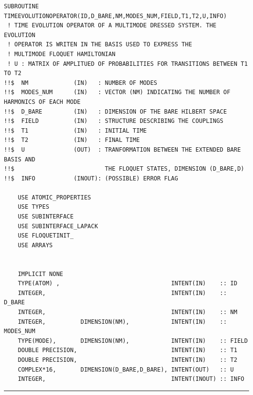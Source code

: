 \documentclass[10pt,a4paper]{article}
\begin{document}
\begin{verbatim}
SUBROUTINE TIMEEVOLUTIONOPERATOR(ID,D_BARE,NM,MODES_NUM,FIELD,T1,T2,U,INFO) 
 ! TIME EVOLUTION OPERATOR OF A MULTIMODE DRESSED SYSTEM. THE EVOLUTION 
 ! OPERATOR IS WRITEN IN THE BASIS USED TO EXPRESS THE 
 ! MULTIMODE FLOQUET HAMILTONIAN
 ! U : MATRIX OF AMPLITUED OF PROBABILITIES FOR TRANSITIONS BETWEEN T1 TO T2
!!$  NM             (IN)   : NUMBER OF MODES            
!!$  MODES_NUM      (IN)   : VECTOR (NM) INDICATING THE NUMBER OF HARMONICS OF EACH MODE
!!$  D_BARE         (IN)   : DIMENSION OF THE BARE HILBERT SPACE
!!$  FIELD          (IN)   : STRUCTURE DESCRIBING THE COUPLINGS
!!$  T1             (IN)   : INITIAL TIME
!!$  T2             (IN)   : FINAL TIME
!!$  U              (OUT)  : TRANFORMATION BETWEEN THE EXTENDED BARE BASIS AND 
!!$                          THE FLOQUET STATES, DIMENSION (D_BARE,D)
!!$  INFO           (INOUT): (POSSIBLE) ERROR FLAG
    
    USE ATOMIC_PROPERTIES
    USE TYPES
    USE SUBINTERFACE
    USE SUBINTERFACE_LAPACK
    USE FLOQUETINIT_ 
    USE ARRAYS 

    
    IMPLICIT NONE
    TYPE(ATOM) ,                                INTENT(IN)    :: ID
    INTEGER,                                    INTENT(IN)    :: D_BARE
    INTEGER,                                    INTENT(IN)    :: NM
    INTEGER,          DIMENSION(NM),            INTENT(IN)    :: MODES_NUM
    TYPE(MODE),       DIMENSION(NM),            INTENT(IN)    :: FIELD 
    DOUBLE PRECISION,                           INTENT(IN)    :: T1
    DOUBLE PRECISION,                           INTENT(IN)    :: T2
    COMPLEX*16,       DIMENSION(D_BARE,D_BARE), INTENT(OUT)   :: U
    INTEGER,                                    INTENT(INOUT) :: INFO
\end{verbatim}
\begin{center}
\rule{12cm}{1pt}
\end{center}
\end{document}
